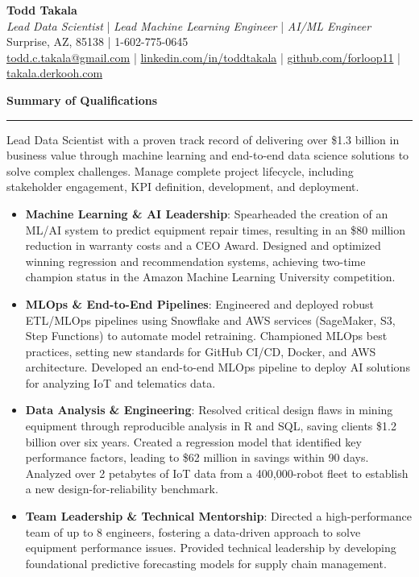 \documentclass[11pt, letterpaper, sans]{article}
\newcommand{\sectionheader}[1]{%
  \vspace{11pt}%
  \par\noindent\textbf{\Large #1}\par\hrule\vspace{5pt}%
}
\begin{document}
\begin{center}
    \textbf{\LARGE Todd Takala} \\
    \textit{Lead Data Scientist} | \textit{Lead Machine Learning Engineer} | \textit{AI/ML Engineer} \\
    Surprise, AZ, 85138 | 1-602-775-0645 \\
    \href{mailto:todd.c.takala@gmail.com}{todd.c.takala@gmail.com} | \href{https://www.linkedin.com/in/toddtakala}{linkedin.com/in/toddtakala} | \href{https://www.github.com/forloop11}{github.com/forloop11} | \href{https://takala.derkooh.com/}{takala.derkooh.com}
\end{center}

\sectionheader{Summary of Qualifications}

Lead Data Scientist with a proven track record of delivering over \$1.3 billion in business value through machine learning and end-to-end data science solutions to solve complex challenges. Manage complete project lifecycle, including stakeholder engagement, KPI definition, development, and deployment.

\begin{itemize}
    \item \textbf{Machine Learning \& AI Leadership}: Spearheaded the creation of an ML/AI system to predict equipment repair times, resulting in an \$80 million reduction in warranty costs and a CEO Award. Designed and optimized winning regression and recommendation systems, achieving two-time champion status in the Amazon Machine Learning University competition.

    \item \textbf{MLOps \& End-to-End Pipelines}: Engineered and deployed robust ETL/MLOps pipelines using Snowflake and AWS services (SageMaker, S3, Step Functions) to automate model retraining. Championed MLOps best practices, setting new standards for GitHub CI/CD, Docker, and AWS architecture. Developed an end-to-end MLOps pipeline to deploy AI solutions for analyzing IoT and telematics data.

    \item \textbf{Data Analysis \& Engineering}: Resolved critical design flaws in mining equipment through reproducible analysis in R and SQL, saving clients \$1.2 billion over six years. Created a regression model that identified key performance factors, leading to \$62 million in savings within 90 days. Analyzed over 2 petabytes of IoT data from a 400,000-robot fleet to establish a new design-for-reliability benchmark.
    
    \item \textbf{Team Leadership \& Technical Mentorship}: Directed a high-performance team of up to 8 engineers, fostering a data-driven approach to solve equipment performance issues. Provided technical leadership by developing foundational predictive forecasting models for supply chain management.
    
\end{itemize}
\end{document}
